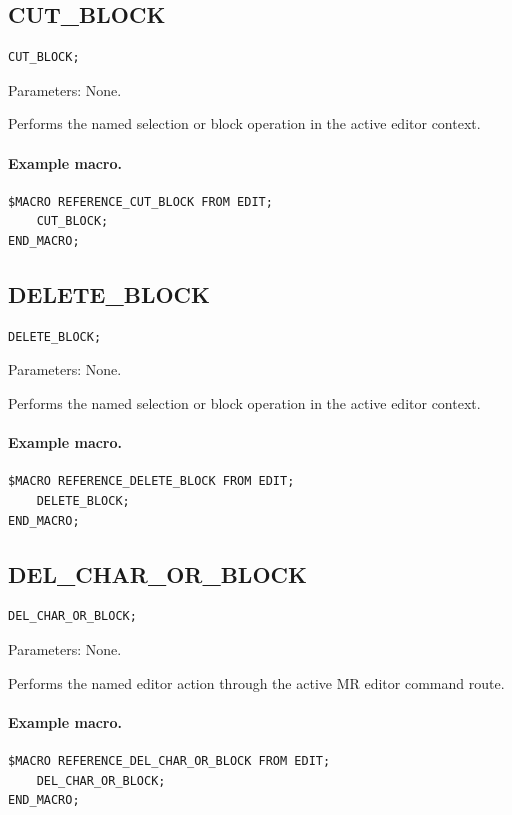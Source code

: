 \documentclass[a4paper,10pt,twoside,openany]{book}
\newenvironment{mrmacextension}{\begin{changebar}}{\end{changebar}}
\begin{document}
\begin{mrmacextension}
\label{prim:procedure-cut-block}
\subsection*{CUT\_BLOCK}
\begin{verbatim}
CUT_BLOCK;
\end{verbatim}
Parameters: None.

Performs the named selection or block operation in the active editor context.

\paragraph{Example macro.}
\begin{verbatim}
$MACRO REFERENCE_CUT_BLOCK FROM EDIT;
    CUT_BLOCK;
END_MACRO;
\end{verbatim}
\end{mrmacextension}

\label{prim:procedure-delete-block}
\subsection*{DELETE\_BLOCK}
\begin{verbatim}
DELETE_BLOCK;
\end{verbatim}
Parameters: None.

Performs the named selection or block operation in the active editor context.

\paragraph{Example macro.}
\begin{verbatim}
$MACRO REFERENCE_DELETE_BLOCK FROM EDIT;
    DELETE_BLOCK;
END_MACRO;
\end{verbatim}

\begin{mrmacextension}
\label{prim:procedure-del-char-or-block}
\subsection*{DEL\_CHAR\_OR\_BLOCK}
\begin{verbatim}
DEL_CHAR_OR_BLOCK;
\end{verbatim}
Parameters: None.

Performs the named editor action through the active MR editor command route.

\paragraph{Example macro.}
\begin{verbatim}
$MACRO REFERENCE_DEL_CHAR_OR_BLOCK FROM EDIT;
    DEL_CHAR_OR_BLOCK;
END_MACRO;
\end{verbatim}
\end{mrmacextension}
\end{document}
